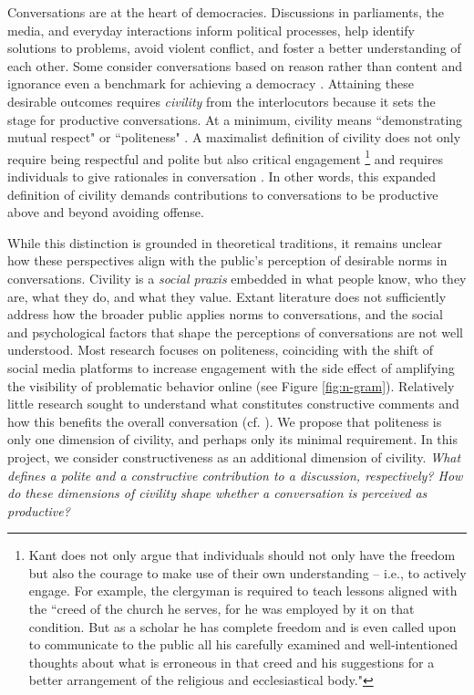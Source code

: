 \documentclass{article}
\begin{document}
Conversations are at the heart of democracies. Discussions in parliaments, the media, and everyday interactions inform political processes, help identify solutions to problems, avoid violent conflict, and foster a better understanding of each other. Some consider conversations based on reason rather than content and ignorance even a benchmark for achieving a democracy \citep{sanders_against_1997}. Attaining these desirable outcomes requires \textit{civility} from the interlocutors because it sets the stage for productive conversations. 
At a minimum,  civility means ``demonstrating mutual respect" \citep{mutz_inyourface_2016} or ``politeness" \citep{frimer_montagu_2018}. A maximalist definition of civility does not only require being respectful and polite but also critical engagement \citep{kant_enlightenment_1784}\footnote{Kant does not only argue that individuals should not only have the freedom but also the courage to make use of their own understanding -- i.e., to actively engage. For example, the clergyman is required to teach lessons aligned with the ``creed of the church he serves, for he was employed by it on that condition. But as a scholar he has complete freedom and is even called upon to communicate to the public all his carefully examined and well-intentioned thoughts about what is erroneous in that creed and his suggestions for a better arrangement of the religious and ecclesiastical body."} and requires individuals to give rationales in conversation \citep{habermas1985theory}. In other words, this expanded definition of civility demands contributions to conversations to be productive above and beyond avoiding offense.

While this distinction is grounded in theoretical traditions, it remains unclear how these perspectives align with the public's perception of desirable norms in conversations. Civility is a \textit{social praxis} embedded in what people know, who they are, what they do, and what they value. Extant literature does not sufficiently address how the broader public applies norms to conversations, and the social and psychological factors that shape the perceptions of conversations are not well understood. Most research focuses on politeness, coinciding with the shift of social media platforms to increase engagement with the side effect of amplifying the visibility of problematic behavior online (see Figure \ref{fig:n-gram}). Relatively little research sought to understand what constitutes constructive comments and how this benefits the overall conversation (cf. \citealp{mizil2016conversational}). We propose that politeness is only one dimension of civility, and perhaps only its minimal requirement. In this project, we consider constructiveness as an additional dimension of civility. \textit{What defines a polite and a constructive contribution to a discussion, respectively? How do these dimensions of civility shape whether a conversation is perceived as productive?}
\end{document}
